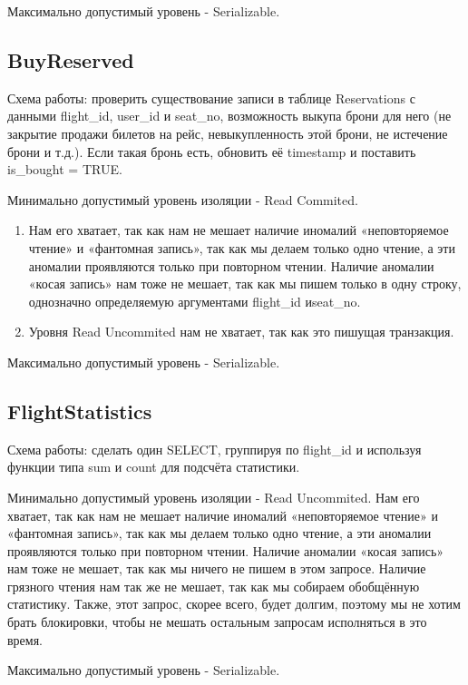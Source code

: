 \documentclass{article}
\begin{document}
Максимально допустимый уровень - Serializable.

\subsection{BuyReserved}

Схема работы: проверить существование записи в таблице Reservations с данными flight\_id, user\_id и seat\_no, возможность выкупа брони для него (не закрытие продажи билетов на рейс, невыкупленность этой брони, не истечение брони и т.д.). Если такая бронь есть, обновить её timestamp и поставить is\_bought = TRUE.
 
Минимально допустимый уровень изоляции - Read Commited.
\begin{enumerate}
\item Нам его хватает, так как нам не мешает наличие иномалий «неповторяемое чтение» и «фантомная запись», так как мы делаем только одно чтение, а эти аномалии проявляются только при повторном чтении. Наличие аномалии «косая запись» нам тоже не мешает, так как мы пишем только в одну строку, однозначно определяемую аргументами flight\_id иseat\_no.

\item Уровня Read Uncommited нам не хватает, так как это пишущая транзакция.
\end{enumerate}

Максимально допустимый уровень - Serializable.

\subsection{FlightStatistics}

Схема работы: сделать один SELECT, группируя по flight\_id и используя функции типа sum и count для подсчёта статистики.

Минимально допустимый уровень изоляции - Read Uncommited. Нам его хватает, так как нам не мешает наличие иномалий «неповторяемое чтение» и «фантомная запись», так как мы делаем только одно чтение, а эти аномалии проявляются только при повторном чтении. Наличие аномалии «косая запись» нам тоже не мешает, так как мы ничего не пишем в этом запросе. Наличие грязного чтения нам так же не мешает, так как мы собираем обобщённую статистику. Также, этот запрос, скорее всего, будет долгим, поэтому мы не хотим брать блокировки, чтобы не мешать остальным запросам исполняться в это время.

Максимально допустимый уровень - Serializable.
\end{document}
